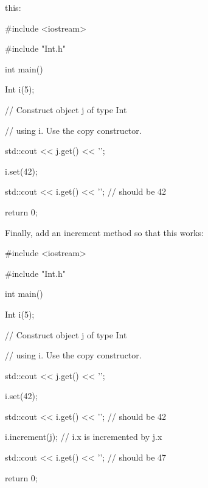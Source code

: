 this:



\begin{consolethree}[escapeinside=||]

#include <iostream>

#include "Int.h"



int main()

{

    Int i(5);

    // Construct object j of type Int

    // using i. Use the copy constructor.

    std::cout << j.get() << '\n';



    i.set(42);

    std::cout << i.get() << '\n'; // should be 42



    return 0;

}

\end{consolethree}



Finally, add an increment method so that this works:



\begin{consolethree}[escapeinside=||]

#include <iostream>

#include "Int.h"



int main()

{

    Int i(5);

    // Construct object j of type Int

    // using i. Use the copy constructor.

    std::cout << j.get() << '\n';



    i.set(42);

    std::cout << i.get() << '\n'; // should be 42



    i.increment(j); // i.x is incremented by j.x

    std::cout << i.get() << '\n'; // should be 47



    return 0;

}

\end{consolethree}

